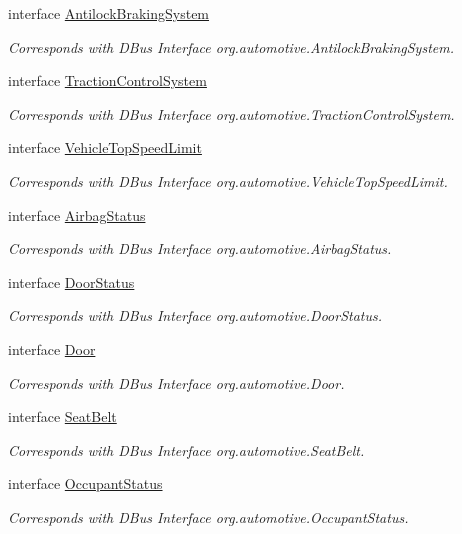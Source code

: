 \begin{DoxyCompactItemize}
interface \hyperlink{interfaceAntilockBrakingSystem}{Antilock\+Braking\+System}
\begin{DoxyCompactList}\small\item\em Corresponds with D\+Bus Interface org.\+automotive.\+Antilock\+Braking\+System. \end{DoxyCompactList}\item 
interface \hyperlink{interfaceTractionControlSystem}{Traction\+Control\+System}
\begin{DoxyCompactList}\small\item\em Corresponds with D\+Bus Interface org.\+automotive.\+Traction\+Control\+System. \end{DoxyCompactList}\item 
interface \hyperlink{interfaceVehicleTopSpeedLimit}{Vehicle\+Top\+Speed\+Limit}
\begin{DoxyCompactList}\small\item\em Corresponds with D\+Bus Interface org.\+automotive.\+Vehicle\+Top\+Speed\+Limit. \end{DoxyCompactList}\item 
interface \hyperlink{interfaceAirbagStatus}{Airbag\+Status}
\begin{DoxyCompactList}\small\item\em Corresponds with D\+Bus Interface org.\+automotive.\+Airbag\+Status. \end{DoxyCompactList}\item 
interface \hyperlink{interfaceDoorStatus}{Door\+Status}
\begin{DoxyCompactList}\small\item\em Corresponds with D\+Bus Interface org.\+automotive.\+Door\+Status. \end{DoxyCompactList}\item 
interface \hyperlink{interfaceDoor}{Door}
\begin{DoxyCompactList}\small\item\em Corresponds with D\+Bus Interface org.\+automotive.\+Door. \end{DoxyCompactList}\item 
interface \hyperlink{interfaceSeatBelt}{Seat\+Belt}
\begin{DoxyCompactList}\small\item\em Corresponds with D\+Bus Interface org.\+automotive.\+Seat\+Belt. \end{DoxyCompactList}\item 
interface \hyperlink{interfaceOccupantStatus}{Occupant\+Status}
\begin{DoxyCompactList}\small\item\em Corresponds with D\+Bus Interface org.\+automotive.\+Occupant\+Status. \end{DoxyCompactList}\item 

\end{DoxyCompactItemize}
